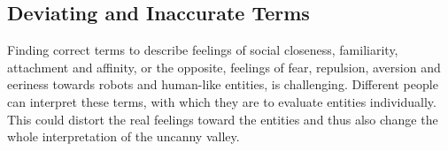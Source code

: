 \subsection{Deviating and Inaccurate Terms}
Finding correct terms to describe feelings of social closeness, familiarity, attachment and affinity, or the opposite, feelings of fear, repulsion, aversion and eeriness towards robots and human-like entities, is challenging. Different people can interpret these terms, with which they are to evaluate entities individually. This could distort the real feelings toward the entities and thus also change the whole interpretation of the uncanny valley.
\begin{table}
\centering
\setlength{\extrarowheight}{0pt}
\addtolength{\extrarowheight}{\aboverulesep}
\addtolength{\extrarowheight}{\belowrulesep}
\setlength{\aboverulesep}{0pt}
\setlength{\belowrulesep}{0pt}
\end{table}
